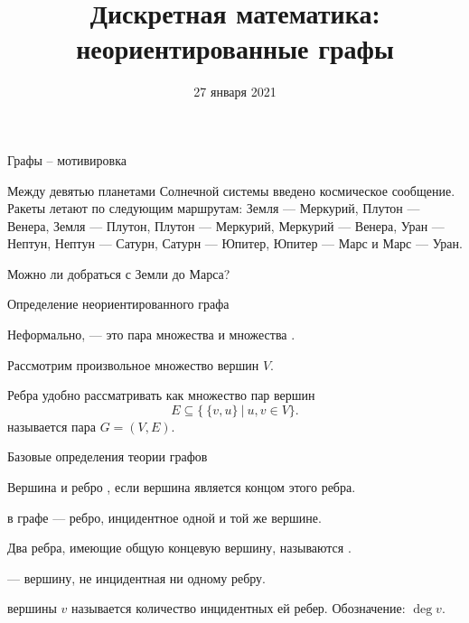 

\date{27 января 2021}		%
\setcounter{s}{3}			%




\title{Дискретная математика:\\
неориентированные графы}


\begin{frame}
  \titlepage
\end{frame}


\begin{frame}{Графы -- мотивировка}

\exmpl Между девятью планетами Солнечной системы введено космическое сообщение. Ракеты летают по следующим маршрутам: Земля --- Меркурий, Плутон --- Венера, Земля --- Плутон, Плутон --- Меркурий, Меркурий --- Венера, Уран --- Нептун, Нептун --- Сатурн, Сатурн --- Юпитер, Юпитер --- Марс и Марс --- Уран.

Можно ли добраться с Земли до Марса?

\end{frame}


\begin{frame}{Определение неориентированного графа}

Неформально,  --- это пара множества  и множества .

Рассмотрим произвольное множество вершин $V$.

Ребра удобно рассматривать как множество пар вершин $$E\subseteq \{\ \{v,u\}\ |\ u,v \in V\}.$$
 {} называется пара $G=(V,E)$.



\end{frame}


\begin{frame}{Базовые определения теории графов}

 Вершина и ребро , если вершина является концом этого ребра.

 {} в графе --- ребро, инцидентное одной и той же вершине. 

 Два ребра, имеющие общую концевую вершину, называются .

 {} --- вершину, не инцидентная ни одному ребру.

 {} вершины $v$ называется количество инцидентных ей ребер. Обозначение: $\deg v.$

\end{frame}


